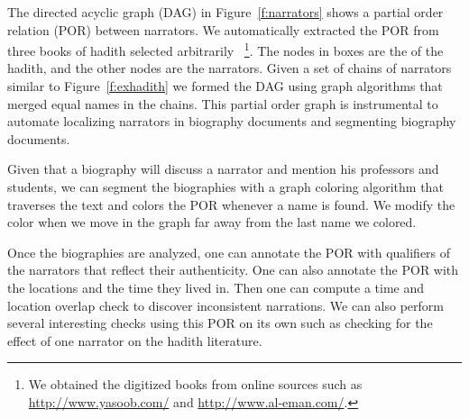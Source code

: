 \documentclass[12pt]{article}
\begin{document}
\begin{figure}[tb]
\end{figure}

The directed acyclic graph (DAG) 
in Figure~\ref{f:narrators} shows a partial order relation (POR) 
between narrators.
We automatically extracted the POR from three books of hadith 
selected arbitrarily~\cite{IbnHanbal,AlKulayni,AlTousi}
\footnote{We obtained
  the digitized books from online sources such as 
  \href{http://www.yasoob.com/}{http://www.yasoob.com/} and 
  \href{http://www.al-eman.com/}{http://www.al-eman.com/}. }.
The nodes in boxes are the  of the hadith, 
and the other nodes are the narrators.
Given a set of chains of narrators similar to 
Figure~\ref{f:exhadith} we formed the DAG using graph algorithms 
that merged equal names in the chains. 
This partial order graph is instrumental to automate
localizing narrators in biography documents and
segmenting biography documents.

Given that a biography will discuss a narrator and mention
his professors and students,
we can segment the biographies with a graph coloring algorithm 
that traverses the text and colors the POR whenever
a name is found. 
We modify the color when we move in the graph 
far away from the last name we colored.

Once the biographies are analyzed, one can annotate
the POR with qualifiers of the narrators that reflect
their authenticity. 
One can also annotate the POR with the locations and 
the time they lived in. 
Then one can compute a time and location overlap
check to discover inconsistent narrations.
We can also perform several interesting checks using 
this POR on its own such as checking for the effect of
one narrator on the hadith literature. 
\end{document}
